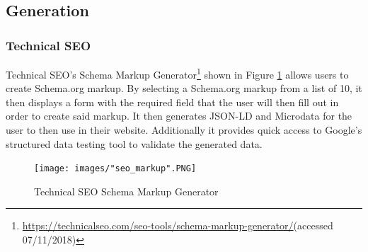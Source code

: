 \subsection{Generation}
\subsubsection*{Technical SEO}
Technical SEO's Schema Markup Generator\footnote{\url{https://technicalseo.com/seo-tools/schema-markup-generator/}(accessed 07/11/2018)} shown in Figure \ref{fig:technicalSEO} allows users to create Schema.org markup. By selecting a Schema.org markup from a list of 10, it then displays a form with the required field that the user will then fill out in order to create said markup. It then generates JSON-LD and Microdata for the user to then use in their website. Additionally it provides quick access to Google's structured data testing tool to validate the generated data. \newline

\begin{figure}[h!]
 \centering\texttt{[image: images/"seo\_markup".PNG]}
   \caption{Technical SEO Schema Markup Generator}
    \label{fig:technicalSEO}
\end{figure}

\newpage

